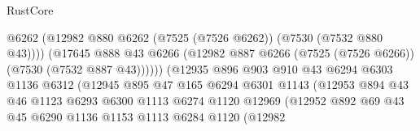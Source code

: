\begin{lexlean}{RustCore}
\begin{coremodule}
                                          @6262
                                          (@12982
                                            @880
                                            @6262
                                            (@7525 (@7526 @6262))
                                            (@7530 (@7532 @880 @43))))
                                        (@17645
                                          @888
                                          @43
                                          @6266
                                          (@12982
                                            @887
                                            @6266
                                            (@7525 (@7526 @6266))
                                            (@7530 (@7532 @887 @43))))))
                                    (@12935
                                      @896
                                      @903
                                      @910
                                      @43
                                      @6294
                                      @6303
                                      @1136
                                      @6312
                                      (@12945
                                        @895
                                        @47
                                        @165
                                        @6294
                                        @6301
                                        @1143
                                        (@12953
                                          @894
                                          @43
                                          @46
                                          @1123
                                          @6293
                                          @6300
                                          @1113
                                          @6274
                                          @1120
                                          @12969
                                          (@12952
                                            @892
                                            @69
                                            @43
                                            @45
                                            @6290
                                            @1136
                                            @1153
                                            @1113
                                            @6284
                                            @1120
                                            (@12982

\end{coremodule}
\end{lexlean}
